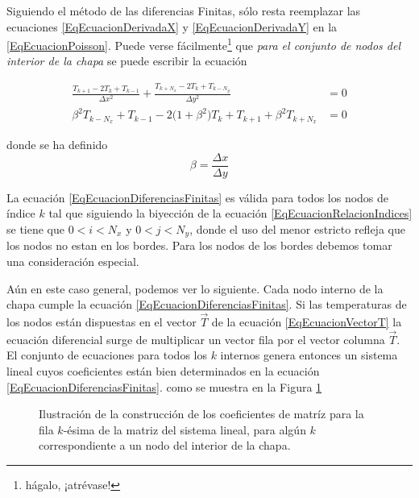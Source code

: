 Siguiendo el método de las diferencias Finitas, 
sólo resta reemplazar las ecuaciones \ref{EqEcuacionDerivadaX} 
y \ref{EqEcuacionDerivadaY} en la \ref{EqEcuacionPoisson}. Puede
verse fácilmente\footnote{hágalo, ¡atrévase!} que \emph{para el 
conjunto de nodos del interior de la chapa } se puede escribir
la ecuación

\begin{equation}\label{EqEcuacionDiferenciasFinitas}
  \begin{aligned}
    \frac{T_{k+1} - 2T_k +T_{k-1} }
    {\Delta x ^2}    
    +
    \frac{T_{k+N_x} - 2T_k +T_{k-N_y} }
    {\Delta y ^2}
    &= 0 \\
    \beta ^2 T_{k-N_x}+T_{k-1} 
    - 2\big(1+\beta^2\big) T_k
    +T_{k+1} + \beta^2 T_{k+N_x} &= 0
  \end{aligned}
\end{equation}

donde se ha definido 
\begin{equation}\label{EqEcuacionBeta}
  \beta = \frac{\Delta x}{\Delta y}
\end{equation}

La ecuación 
\ref{EqEcuacionDiferenciasFinitas}
es válida para todos los nodos de índice
$k$ tal que siguiendo la biyección de la
ecuación \ref{EqEcuacionRelacionIndices}
se tiene que $0<i<N_x$ y $0<j<N_y$, donde
el uso del menor estricto refleja que
los nodos no estan en los bordes. 
Para los
nodos de los bordes debemos tomar una 
consideración especial. 

Aún en este caso general, podemos ver 
lo siguiente. Cada nodo interno de la chapa
cumple la ecuación \ref{EqEcuacionDiferenciasFinitas}. Si las 
temperaturas de los nodos están dispuestas en
el vector $\vec{T}$ de la ecuación \ref{EqEcuacionVectorT}
la ecuación diferencial surge de multiplicar
un vector fila por el vector columna $\vec{T}$.
El conjunto de ecuaciones para todos los $k$
internos genera entonces un sistema lineal 
cuyos coeficientes están bien determinados 
en la ecuación \ref{EqEcuacionDiferenciasFinitas}.
como se muestra en la Figura \ref{FiguraCoeficientesMatriz}

\begin{figure}
  \caption{Ilustración de la construcción de los coeficientes de matríz
  para la fila $k$-ésima de la matriz del sistema lineal, para algún
  $k$ correspondiente a un nodo del interior de la chapa.
  \label{FiguraCoeficientesMatriz}}

\end{figure}
\mode*

